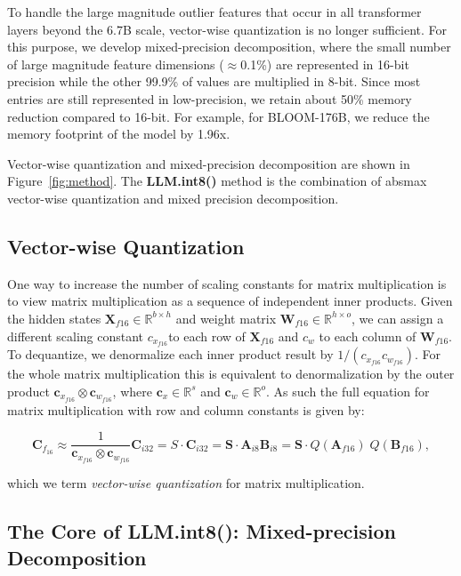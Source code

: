 To handle the large magnitude outlier features that occur in all transformer layers beyond the 6.7B scale, vector-wise quantization is no longer sufficient. For this purpose, we develop mixed-precision decomposition, where the small number of large magnitude feature dimensions ($\approx$0.1\%) are represented in 16-bit precision while the other 99.9\% of values are multiplied in 8-bit. Since most entries are still represented in low-precision, we retain about 50\% memory reduction compared to 16-bit. For example, for BLOOM-176B, we reduce the memory footprint of the model by 1.96x.

Vector-wise quantization and mixed-precision decomposition are shown in Figure~\ref{fig:method}. The {\bf LLM.int8()} method is the combination of absmax vector-wise quantization and mixed precision decomposition. 

\subsection{Vector-wise Quantization}

One way to increase the number of scaling constants for matrix multiplication is to view matrix multiplication as a sequence of independent inner products. Given the hidden states $\mathbf{X}_{f16}\in \mathbb{R}^{b\times h}$ and weight matrix $\mathbf{W}_{f16}\in \mathbb{R}^{h\times o}$, we can assign a different scaling constant $c_{x_{f16}}$to each row of $\mathbf{X}_{f16}$ and $c_w$ to each column of $\mathbf{W}_{f16}$. To dequantize, we denormalize each inner product result by $1/(c_{x_{f16}}c_{w_{f16}})$. For the whole matrix multiplication this is equivalent to denormalization by the outer product $\mathbf{c}_{x_{f16}} \otimes \mathbf{c}_{w_{f16}}$, where $\mathbf{c}_x \in \mathbb{R}^s$ and $\mathbf{c}_w \in \mathbb{R}^o$. As such the full equation for matrix multiplication with row and column constants is given by:

\begin{equation}
    \mathbf{C}_{f_{16}} \approx \frac{1}{\mathbf{c}_{x_{f16}}\otimes \mathbf{c}_{w_{f16}}} \mathbf{C}_{i32} = S\cdot\mathbf{C}_{i32}= \mathbf{S}\cdot\mathbf{A}_{i8}\mathbf{B}_{i8} = \mathbf{S}\cdot Q(\mathbf{A}_{f16})\phantom{.} Q(\mathbf{B}_{f16}),
\end{equation}

which we term {\it vector-wise quantization} for matrix multiplication.

\subsection{The Core of LLM.int8(): Mixed-precision Decomposition}

